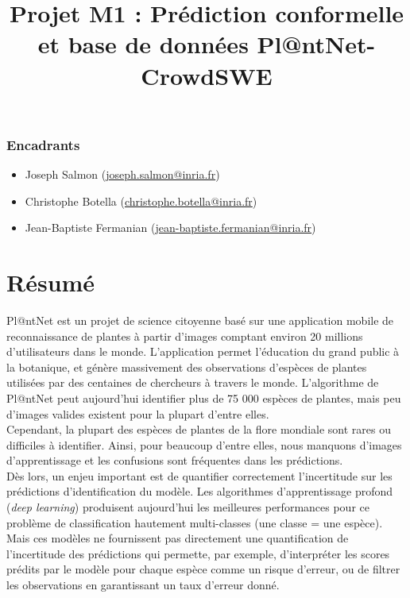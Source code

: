 \documentclass[12pt,a4paper]{article}
\title{Projet M1 : Prédiction conformelle et base de données Pl@ntNet-CrowdSWE}
\author{}
\date{} %
\begin{document}
\maketitle

\vspace{-2cm} %

\subsubsection*{Encadrants}

\begin{itemize}[label=\textbullet, noitemsep]
    \item Joseph Salmon (\href{mailto:joseph.salmon@inria.fr}{joseph.salmon@inria.fr})
    \item Christophe Botella (\href{mailto:christophe.botella@inria.fr}{christophe.botella@inria.fr})
    \item Jean-Baptiste Fermanian (\href{mailto:jean-baptiste.fermanian@inria.fr}{jean-baptiste.fermanian@inria.fr})
\end{itemize}

\section*{Résumé}

Pl@ntNet est un projet de science citoyenne basé sur une application mobile de reconnaissance de plantes à partir d'images comptant environ 20 millions d'utilisateurs dans le monde. L'application permet l'éducation du grand public à la botanique, et génère massivement des observations d'espèces de plantes utilisées par des centaines de chercheurs à travers le monde. L'algorithme de Pl@ntNet peut aujourd'hui identifier plus de 75 000 espèces de plantes, mais peu d'images valides existent pour la plupart d'entre elles. \\

Cependant, la plupart des espèces de plantes de la flore mondiale sont rares ou difficiles à identifier. Ainsi, pour beaucoup d'entre elles, nous manquons d'images d'apprentissage et les confusions sont fréquentes dans les prédictions. \\

Dès lors, un enjeu important est de quantifier correctement l'incertitude sur les prédictions d'identification du modèle. Les algorithmes d'apprentissage profond (\textit{deep learning}) produisent aujourd'hui les meilleures performances pour ce problème de classification hautement multi-classes (une classe = une espèce). Mais ces modèles ne fournissent pas directement une quantification de l'incertitude des prédictions qui permette, par exemple, d'interpréter les scores prédits par le modèle pour chaque espèce comme un risque d'erreur, ou de filtrer les observations en garantissant un taux d'erreur donné. \\
\end{document}
